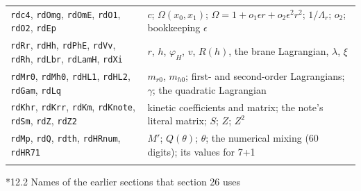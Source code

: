 \documentclass[10pt,a4paper]{article}
\makeatletter
\renewcommand\subsection{\@startsection{subsection}{2}{\z@}{-3.25ex\@plus -1ex \@minus -.2ex}{1.5ex \@plus .2ex}{\normalfont\large\bfseries\raggedright}}
\makeatother
\begin{document}
{\begin{longtable}{>{\raggedright\arraybackslash}p{}>{\raggedright\arraybackslash}p{}}
\texttt{rdc4}, \texttt{rdOmg}, \texttt{rdOmE}, \texttt{rdO1}, \texttt{rdO2}, \texttt{rdEp} & $c$; $\Omega(x_0,x_1)$; $\Omega=1+o_1\epsilon r+o_2\epsilon^2r^2$; $1/\Lambda_r$; $o_2$; bookkeeping $\epsilon$ \\
\texttt{rdRr}, \texttt{rdHh}, \texttt{rdPhE}, \texttt{rdVv}, \texttt{rdRh}, \texttt{rdLbr}, \texttt{rdLamH}, \texttt{rdXi} & $r$, $h$, $\varphi_H$, $v$, $R(h)$, the brane Lagrangian, $\lambda$, $\xi$ \\
\texttt{rdMr0}, \texttt{rdMh0}, \texttt{rdHL1}, \texttt{rdHL2}, \texttt{rdGam}, \texttt{rdLq} & $m_{r0}$, $m_{h0}$; first- and second-order Lagrangians; $\gamma$; the quadratic Lagrangian \\
\texttt{rdKhr}, \texttt{rdKrr}, \texttt{rdKm}, \texttt{rdKnote}, \texttt{rdSm}, \texttt{rdZ}, \texttt{rdZ2} & kinetic coefficients and matrix; the note’s literal matrix; $S$; $Z$; $Z^2$ \\
\texttt{rdMp}, \texttt{rdQ}, \texttt{rdth}, \texttt{rdHRnum}, \texttt{rdHR71} & $M'$; $Q(\theta)$; $\theta$; the numerical mixing (60 digits); its values for 7+1 \\*
\end{longtable}}
\subsection*{12.2 Names of the earlier sections that section 26 uses}
\end{document}
